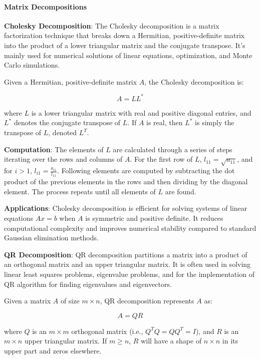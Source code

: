 \documentclass[12pt, twoside,hidelinks]{article}
\theoremstyle{definition}
\numberwithin{equation}{section}
\begin{document}
\paragraph{Matrix Decompositions}

\textbf{Cholesky Decomposition}: The Cholesky decomposition is a matrix factorization technique that breaks down a Hermitian, positive-definite matrix into the product of a lower triangular matrix and the conjugate transpose. It's mainly used for numerical solutions of linear equations, optimization, and Monte Carlo simulations.

Given a Hermitian, positive-definite matrix $A$, the Cholesky decomposition is:

\[
A = LL^*
\]

where $L$ is a lower triangular matrix with real and positive diagonal entries, and $L^*$ denotes the conjugate transpose of $L$. If $A$ is real, then $L^*$ is simply the transpose of $L$, denoted $L^T$.

\textbf{Computation}: The elements of $L$ are calculated through a series of steps iterating over the rows and columns of $A$. For the first row of $L$, $l_{11} = \sqrt{a_{11}}$, and for $i > 1$, $l_{i1} = \frac{a_{i1}}{l_{11}}$. Following elements are computed by subtracting the dot product of the previous elements in the rows and then dividing by the diagonal element. The process repeats until all elements of $L$ are found.
\newline

\textbf{Applications}: Cholesky decomposition is efficient for solving systems of linear equations $Ax = b$ when $A$ is symmetric and positive definite. It reduces computational complexity and improves numerical stability compared to standard Gaussian elimination methods.
\newline

\textbf{QR Decomposition}: QR decomposition partitions a matrix into a product of an orthogonal matrix and an upper triangular matrix. It is often used in solving linear least squares problems, eigenvalue problems, and for the implementation of QR algorithm for finding eigenvalues and eigenvectors.

Given a matrix $A$ of size $m \times n$, QR decomposition represents $A$ as:

\[
A = QR
\]

where $Q$ is an $m \times m$ orthogonal matrix (i.e., $Q^TQ = QQ^T = I$), and $R$ is an $m \times n$ upper triangular matrix. If $m \geq n$, $R$ will have a shape of $n \times n$ in its upper part and zeros elsewhere.
\end{document}
